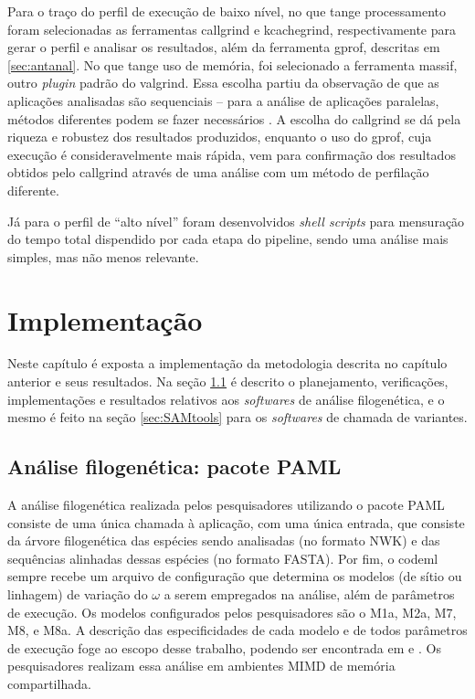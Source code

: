 \documentclass[cic,tc]{iiufrgs}
\begin{document}
Para o traço do perfil de execução de baixo nível, no que tange processamento
foram selecionadas as ferramentas callgrind e kcachegrind, respectivamente para
gerar o perfil e analisar os resultados, além da ferramenta gprof, descritas em
\ref{sec:antanal}. No que tange uso de memória, foi selecionado a ferramenta
massif, outro \textit{plugin} padrão do valgrind. Essa escolha partiu da
observação de que as aplicações analisadas são sequenciais -- para a análise de
aplicações paralelas, métodos diferentes podem se fazer necessários
\cite{weidendorfer2008sequential}. A escolha do callgrind se dá pela riqueza e
robustez dos resultados produzidos, enquanto o uso do gprof, cuja execução é
consideravelmente mais rápida, vem para confirmação dos resultados obtidos pelo
callgrind através de uma análise com um método de perfilação diferente.

Já para o perfil de ``alto nível'' foram desenvolvidos \textit{shell scripts}
para mensuração do tempo total dispendido por cada etapa do pipeline, sendo uma
análise mais simples, mas não menos relevante.

%
%
%
%
\chapter{Implementação}
\label{chap:imp}

Neste capítulo é exposta a implementação da metodologia descrita no capítulo
anterior e seus resultados. Na seção \ref{sec:filomp} é descrito o
planejamento, verificações, implementações e resultados relativos aos \textit{softwares}
de análise filogenética, e o mesmo é feito na seção \ref{sec:SAMtools} para os
\textit{softwares} de chamada de variantes.

\section{Análise filogenética: pacote PAML}
\label{sec:filomp}

A análise filogenética realizada pelos pesquisadores utilizando o pacote PAML
consiste de uma única chamada à aplicação, com uma única entrada, que consiste
da árvore filogenética das espécies sendo analisadas (no formato NWK) e das
sequências alinhadas dessas espécies (no formato FASTA). Por fim, o codeml
sempre recebe um arquivo de configuração que determina os modelos (de sítio ou
linhagem) de variação do $\omega$ a serem empregados na análise, além de
parâmetros de execução. Os modelos configurados pelos pesquisadores são o M1a,
M2a, M7, M8, e M8a. A descrição das especificidades de cada modelo e de todos
parâmetros de execução foge ao escopo desse trabalho, podendo ser encontrada em
\cite{yang2000codon} e \cite{zhang2005evaluation}. Os pesquisadores realizam
essa análise em ambientes MIMD de memória compartilhada.
\end{document}
